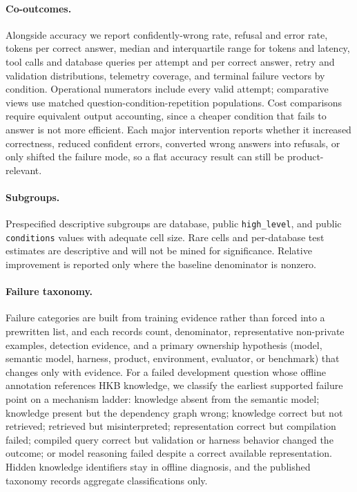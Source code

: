 \paragraph{Co-outcomes.}
Alongside accuracy we report confidently-wrong rate, refusal and error rate,
tokens per correct answer, median and interquartile range for tokens and latency,
tool calls and database queries per attempt and per correct answer, retry and
validation distributions, telemetry coverage, and terminal failure vectors by
condition. Operational numerators include every valid attempt; comparative views
use matched question-condition-repetition populations. Cost comparisons require
equivalent output accounting, since a cheaper condition that fails to answer is
not more efficient. Each major intervention reports whether it increased
correctness, reduced confident errors, converted wrong answers into refusals, or
only shifted the failure mode, so a flat accuracy result can still be
product-relevant.

\paragraph{Subgroups.}
Prespecified descriptive subgroups are database, public \texttt{high\_level}, and
public \texttt{conditions} values with adequate cell size. Rare cells and
per-database test estimates are descriptive and will not be mined for
significance. Relative improvement is reported only where the baseline
denominator is nonzero.

\paragraph{Failure taxonomy.}
Failure categories are built from training evidence rather than forced into a
prewritten list, and each records count, denominator, representative non-private
examples, detection evidence, and a primary ownership hypothesis (model, semantic
model, harness, product, environment, evaluator, or benchmark) that changes only
with evidence. For a failed development question whose offline annotation
references HKB knowledge, we classify the earliest supported failure point on a
mechanism ladder: knowledge absent from the semantic model; knowledge present but
the dependency graph wrong; knowledge correct but not retrieved; retrieved but
misinterpreted; representation correct but compilation failed; compiled query
correct but validation or harness behavior changed the outcome; or model
reasoning failed despite a correct available representation. Hidden knowledge
identifiers stay in offline diagnosis, and the published taxonomy records
aggregate classifications only.

